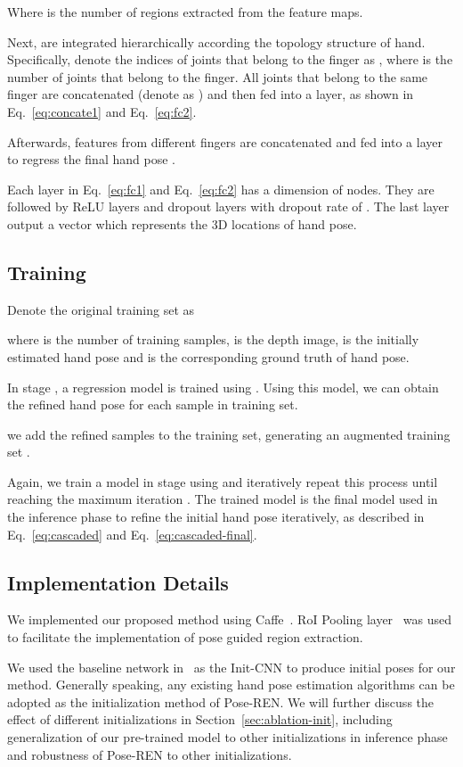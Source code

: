\documentclass[final, 5p]{elsarticle}
\begin{document}
Where  is the number of regions extracted from the feature maps.

Next,  are integrated hierarchically according the topology structure of hand. Specifically, denote the indices of joints that belong to the  finger as , where  is the number of joints that belong to the  finger. All joints that belong to the same finger are concatenated (denote as ) and then fed into a  layer, as shown in Eq.~\ref{eq:concate1} and Eq.~\ref{eq:fc2}.


Afterwards, features from different fingers  are concatenated and fed into a  layer to regress the final hand pose .


Each  layer in Eq.~\ref{eq:fc1} and Eq.~\ref{eq:fc2} has a dimension of  nodes. They are followed by ReLU layers and dropout layers with dropout rate of . The last  layer output a  vector  which represents the 3D locations of hand pose.

\subsection{Training}
\label{sec:training}
Denote the original training set as

where  is the number of training samples,  is the depth image,  is the initially estimated hand pose and  is the corresponding ground truth of hand pose.

In stage , a regression model  is trained using . Using this model, we can obtain the refined hand pose for each sample in training set.

we add the refined samples  to the training set, generating an augmented training set .

Again, we train a model  in stage  using  and iteratively repeat this process until reaching the maximum iteration . The trained model  is the final model used in the inference phase to refine the initial hand pose iteratively, as described in Eq.~\ref{eq:cascaded} and Eq.~\ref{eq:cascaded-final}.


\subsection{Implementation Details}
\label{sec:implementation}
We implemented our proposed method using Caffe~\cite{jia2014caffe}. RoI Pooling layer~\cite{girshick2015fast} was used to facilitate the implementation of pose guided region extraction.

We used the baseline network in~\cite{guo2017region} as the Init-CNN to produce initial poses for our method. Generally speaking, any existing hand pose estimation algorithms can be adopted as the initialization method of Pose-REN. We will further discuss the effect of different initializations in Section~\ref{sec:ablation-init}, including generalization of our pre-trained model to other initializations in inference phase and robustness of Pose-REN to other initializations.
\end{document}
